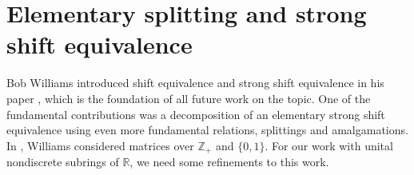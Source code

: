 \documentclass{amsart}
\theoremstyle{definition}
\theoremstyle{remark}
\numberwithin{equation}{section}
\begin{document}
%
%
%
%
%


\section{Elementary splitting and strong shift equivalence }\label{elemsec}


Bob Williams introduced shift equivalence and strong shift equivalence
in his  paper \cite{Wi}, which is the foundation of all 
future work on the topic. One of the fundamental contributions was 
a decomposition of an elementary strong shift equivalence using 
even more fundamental relations, splittings and amalgamations. 
 In \cite{Wi}, 
 Williams considered 
matrices over $\mathbb Z_+$ and $\{0,1\}$.  For our work with 
unital nondiscrete subrings of $\mathbb R$, we need  some 
refinements to this work.
\end{document}

